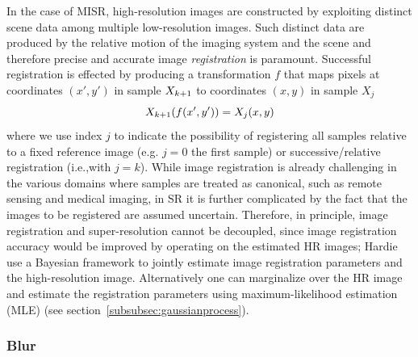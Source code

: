 In the case of MISR, high-resolution images are constructed by exploiting distinct scene data among multiple low-resolution images.
%
Such distinct data are produced by the relative motion of the imaging system and the scene and therefore precise and accurate image \textit{registration} is paramount.
%
Successful registration is effected by producing a transformation \(f\) that maps pixels at coordinates \((x',y')\) in sample \(X_{k+1}\) to coordinates \((x,y)\) in sample \(X_j\)
\begin{equation}
	\Xkone(f(x', y')) = X_j(x,y)
	\label{eqn:registration}
\end{equation}
where we use index \(j\) to indicate the possibility of registering all samples relative to a fixed reference image (e.g. \(j=0\) the first sample) or successive/relative registration (i.e.,with \(j=k\)).
%
While image registration is already challenging in the various domains where samples are treated as canonical, such as remote sensing and medical imaging, in SR it is further complicated by the fact that the images to be registered are assumed uncertain.
%
Therefore, in principle, image registration and super-resolution cannot be decoupled, since image registration accuracy would be improved by operating on the estimated HR images;
%
Hardie \etal~\cite{Hardie1997} use a Bayesian framework to jointly estimate image registration parameters and the high-resolution image\cite{Hardie1997}.
%
Alternatively one can marginalize over the HR image and estimate the registration parameters using maximum-likelihood estimation (MLE) (see section~\ref{subsubsec:gaussianprocess}).

\subsubsection{Blur}

